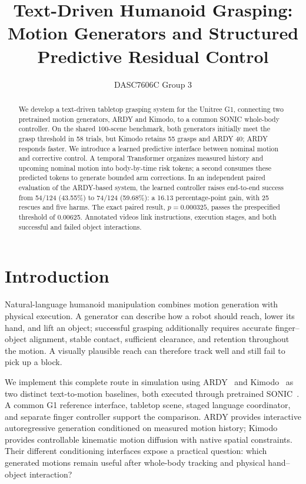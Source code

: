 \documentclass[letterpaper,10pt,conference]{ieeeconf}
\title{\LARGE \bfseries Text-Driven Humanoid Grasping:\\Motion Generators and Structured Predictive Residual Control}
\author{DASC7606C Group 3}
\begin{document}
\maketitle
\thispagestyle{empty}
\pagestyle{empty}

\begin{abstract}
We develop a text-driven tabletop grasping system for the Unitree G1, connecting two pretrained motion generators, ARDY and Kimodo, to a common SONIC whole-body controller. On the shared 100-scene benchmark, both generators initially meet the grasp threshold in 58 trials, but Kimodo retains 55 grasps and ARDY 40; ARDY responds faster. We introduce a learned predictive interface between nominal motion and corrective control. A temporal Transformer organizes measured history and upcoming nominal motion into body-by-time risk tokens; a second consumes these predicted tokens to generate bounded arm corrections. In an independent paired evaluation of the ARDY-based system, the learned controller raises end-to-end success from 54/124 (43.55\%) to 74/124 (59.68\%): a 16.13 percentage-point gain, with 25 rescues and five harms. The exact paired result, $p=0.000325$, passes the prespecified threshold of 0.00625. Annotated videos link instructions, execution stages, and both successful and failed object interactions.
\end{abstract}

\section{Introduction}
Natural-language humanoid manipulation combines motion generation with physical execution. A generator can describe how a robot should reach, lower its hand, and lift an object; successful grasping additionally requires accurate finger--object alignment, stable contact, sufficient clearance, and retention throughout the motion. A visually plausible reach can therefore track well and still fail to pick up a block.

We implement this complete route in simulation using ARDY~\cite{ardy} and Kimodo~\cite{kimodo} as two distinct text-to-motion baselines, both executed through pretrained SONIC~\cite{sonic}. A common G1 reference interface, tabletop scene, staged language coordinator, and separate finger controller support the comparison. ARDY provides interactive autoregressive generation conditioned on measured motion history; Kimodo provides controllable kinematic motion diffusion with native spatial constraints. Their different conditioning interfaces expose a practical question: which generated motions remain useful after whole-body tracking and physical hand--object interaction?
\end{document}
